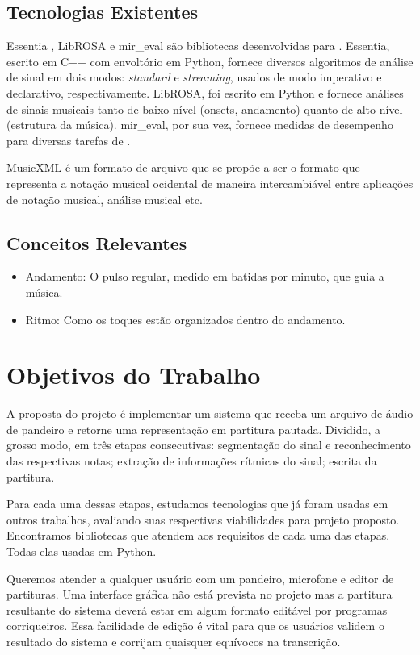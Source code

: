 \documentclass[
  dissertacao,
  brazil
]{ThesisPUC}
\begin{document}
\section{Tecnologias Existentes}
Essentia \cite{bogdanov2013essentia}, LibROSA \cite{mcfee2015librosaDesign} e mir\_eval \cite{raffel2014mir_eval} são bibliotecas desenvolvidas para \mir. Essentia, escrito em C++ com envoltório em Python, fornece diversos algoritmos de análise de sinal em dois modos: \emph{standard} e \emph{streaming}, usados de modo imperativo e declarativo, respectivamente. LibROSA, foi escrito em Python e fornece análises de sinais musicais tanto de baixo nível (onsets, andamento) quanto de alto nível (estrutura da música). mir\_eval, por sua vez, fornece medidas de desempenho para diversas tarefas de \MIR.

MusicXML \cite{good2001musicxml} é um formato de arquivo que se propõe a ser o formato que representa a notação musical ocidental de maneira intercambiável entre aplicações de notação musical, análise musical etc.

\section{Conceitos Relevantes}
\begin{itemize}
    \item Andamento: O pulso regular, medido em batidas por minuto, que guia a música.
    \item Ritmo: Como os toques estão organizados dentro do andamento.
\end{itemize}



\chapter{Objetivos do Trabalho}
A proposta do projeto é implementar um sistema que receba um arquivo de áudio de pandeiro e retorne uma representação em partitura pautada. Dividido, a grosso modo, em três etapas consecutivas: segmentação do sinal e reconhecimento das respectivas notas; extração de informações rítmicas do sinal; escrita da partitura.

Para cada uma dessas etapas, estudamos tecnologias que já foram usadas em outros trabalhos, avaliando suas respectivas viabilidades para projeto proposto. Encontramos bibliotecas que atendem aos requisitos de cada uma das etapas. Todas elas usadas em Python. 

Queremos atender a qualquer usuário com um pandeiro, microfone e editor de partituras. Uma interface gráfica não está prevista no projeto mas a partitura resultante do sistema deverá estar em algum formato editável por programas corriqueiros. Essa facilidade de edição é vital para que os usuários validem o resultado do sistema e corrijam quaisquer equívocos na transcrição.
\end{document}
